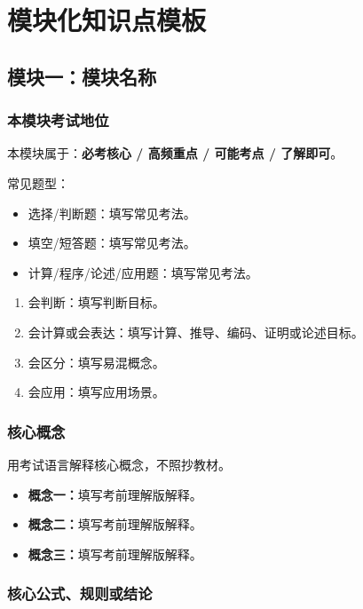 \documentclass[UTF8,zihao=-4]{ctexart}
\begin{document}
\section{模块化知识点模板}

\subsection{模块一：模块名称}

\subsubsection{本模块考试地位}
本模块属于：\textbf{必考核心 / 高频重点 / 可能考点 / 了解即可}。

常见题型：
\begin{itemize}
  \item 选择/判断题：填写常见考法。
  \item 填空/短答题：填写常见考法。
  \item 计算/程序/论述/应用题：填写常见考法。
\end{itemize}

\begin{keybox}[本模块复习目标]
\begin{enumerate}
  \item 会判断：填写判断目标。
  \item 会计算或会表达：填写计算、推导、编码、证明或论述目标。
  \item 会区分：填写易混概念。
  \item 会应用：填写应用场景。
\end{enumerate}
\end{keybox}

\subsubsection{核心概念}
用考试语言解释核心概念，不照抄教材。

\begin{itemize}
  \item \textbf{概念一：}填写考前理解版解释。
  \item \textbf{概念二：}填写考前理解版解释。
  \item \textbf{概念三：}填写考前理解版解释。
\end{itemize}

\subsubsection{核心公式、规则或结论}
\end{document}
